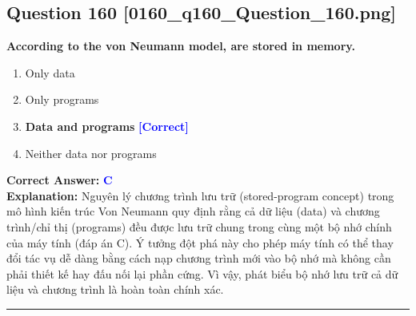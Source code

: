\documentclass[11pt,a4paper]{article}
\begin{document}
\begin{minipage}{\textwidth}
\subsection*{Question 160 \quad \footnotesize{[0160\_q160\_Question\_160.png]}}
\noindent \textbf{According to the von Neumann model, are stored in memory.}

\begin{enumerate}[label=\Alph*.]
    \item Only data
    \item Only programs
    \item \textbf{Data and programs} \hfill \textcolor{blue}{\textbf{[Correct]}}
    \item Neither data nor programs
\end{enumerate}

\noindent \textbf{Correct Answer:} \textcolor{blue}{\textbf{C}} \\[2pt]
\noindent \textbf{Explanation:} Nguyên lý chương trình lưu trữ (stored-program concept) trong mô hình kiến trúc Von Neumann quy định rằng cả dữ liệu (data) và chương trình/chỉ thị (programs) đều được lưu trữ chung trong cùng một bộ nhớ chính của máy tính (đáp án C). Ý tưởng đột phá này cho phép máy tính có thể thay đổi tác vụ dễ dàng bằng cách nạp chương trình mới vào bộ nhớ mà không cần phải thiết kế hay đấu nối lại phần cứng. Vì vậy, phát biểu bộ nhớ lưu trữ cả dữ liệu và chương trình là hoàn toàn chính xác.

\par\vspace{0.3cm}
\hrule
\vspace{0.3cm}
\end{minipage}
\end{document}
